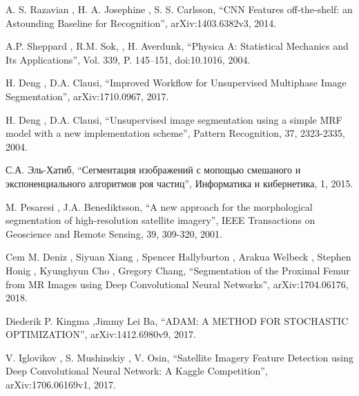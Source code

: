 \documentclass[14pt, a4paper, oneside, bold]{extarticle}
\begin{document}
\begin{thebibliography}{99}
 A. S. Razavian
	, H. A. Josephine
	, S. S. Carlsson,
	``CNN Features off-the-shelf: an Astounding Baseline for Recognition'', 
arXiv:1403.6382v3, 2014.

 A.P. Sheppard
	, R.M. Sok,
	, H. Averdunk, ``Physica A: Statistical Mechanics and Its Applications'', Vol. 339, P. 145–151, doi:10.1016, 2004.

 H. Deng
	, D.A. Clausi, 
	``Improved Workflow for Unsupervised Multiphase Image Segmentation'', 
arXiv:1710.0967, 2017.

 H. Deng
	, D.A. Clausi, 
	``Unsupervised image segmentation using a simple MRF model with a new implementation scheme'', 
Pattern Recognition, 37, 2323-2335, 2004.

 С.А. Эль-Хатиб,
	``Сегментация изображений с мопощью смешаного и экспоненциального алгоритмов роя частиц'', 
Информатика и кибернетика, 1, 2015.

  M. Pesaresi
	, J.A. Benediktsson,
	``A new approach for the morphological segmentation of high-resolution satellite imagery'', 
 IEEE Transactions on Geoscience and Remote Sensing, 39, 309-320, 2001.

  Cem M. Deniz
	, Siyuan Xiang
	, Spencer Hallyburton
	, Arakua Welbeck
	, Stephen Honig
	, Kyunghyun Cho
	, Gregory Chang,
	``Segmentation of the Proximal Femur from MR Images using Deep Convolutional Neural Networks'', 
 	arXiv:1704.06176, 2018.

  Diederik P. Kingma
	,Jimmy Lei Ba,
	``ADAM: A METHOD FOR STOCHASTIC OPTIMIZATION'', 
 	arXiv:1412.6980v9, 2017.

  V. Iglovikov
	, S. Mushinskiy
	, V. Osin,
	``Satellite Imagery Feature Detection using
Deep Convolutional Neural Network: A Kaggle Competition'', 
 	arXiv:1706.06169v1, 2017.

\end{thebibliography}
\end{document}

